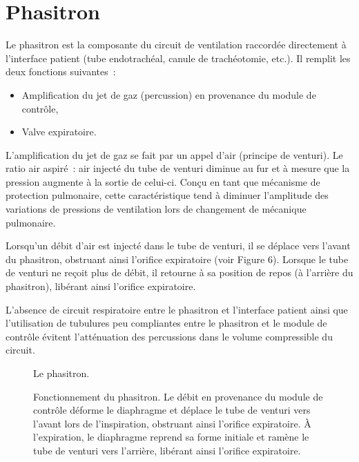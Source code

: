 
\section{Phasitron}
Le phasitron est la composante du circuit de ventilation raccordée directement à l’interface patient (tube endotrachéal, canule de trachéotomie, etc.). Il remplit les deux fonctions suivantes : \begin{itemize}
	\item Amplification du jet de gaz (percussion) en provenance du module de contrôle,
	\item Valve expiratoire.
\end{itemize}

L’amplification du jet de gaz se fait par un appel d’air (principe de venturi). Le ratio air aspiré : air injecté du tube de venturi diminue au fur et à mesure que la pression augmente à la sortie de celui-ci. Conçu en tant que mécanisme de protection pulmonaire, cette caractéristique tend à diminuer l’amplitude des variations de pressions de ventilation lors de changement de mécanique pulmonaire.

Lorsqu’un débit d’air est injecté dans le tube de venturi, il se déplace vers l’avant du phasitron, obstruant ainsi l’orifice expiratoire (voir Figure 6). Lorsque le tube de venturi ne reçoit plus de débit, il retourne à sa position de repos (à l’arrière du phasitron), libérant ainsi l’orifice expiratoire.

L’absence de circuit respiratoire entre le phasitron et l’interface patient ainsi que l’utilisation de tubulures peu compliantes entre le phasitron et le module de contrôle évitent l’atténuation des percussions dans le volume compressible du circuit.

\begin{figure}
	
	\caption{Le phasitron.}
\end{figure}

\begin{figure}
	
	\caption{Fonctionnement du phasitron. Le débit en provenance du module de contrôle déforme le diaphragme et déplace le tube de venturi vers l’avant lors de l’inspiration, obstruant ainsi l’orifice expiratoire. À l’expiration, le diaphragme reprend sa forme initiale et ramène le tube de venturi vers l’arrière, libérant ainsi l’orifice expiratoire.}
\end{figure}

